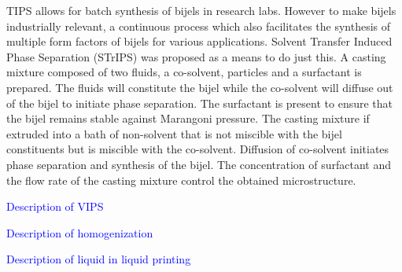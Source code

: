 TIPS allows for batch synthesis of bijels in research labs. However to make bijels industrially relevant, a continuous process which also facilitates the 
synthesis of multiple form factors of bijels for various applications. Solvent Transfer Induced Phase Separation (STrIPS) was proposed as a means to do just this. 
A casting mixture composed of two fluids, a co-solvent, particles and a surfactant is prepared. The fluids will constitute the bijel while the co-solvent will 
diffuse out of the bijel to initiate phase separation. The surfactant is present to ensure that the bijel remains stable against Marangoni pressure. The casting 
mixture if extruded into a bath of non-solvent that is not miscible with the bijel constituents but is miscible with the co-solvent. Diffusion of co-solvent 
initiates phase separation and synthesis of the bijel. The concentration of surfactant and the flow rate of the casting mixture control the obtained microstructure. 

\textcolor{blue}{Description of VIPS}

\textcolor{blue}{Description of homogenization}

\textcolor{blue}{Description of liquid in liquid printing}



